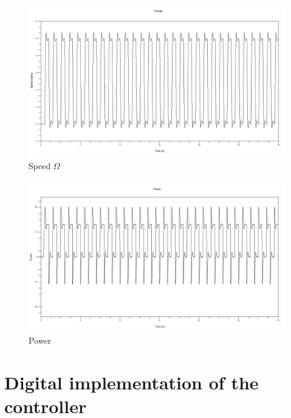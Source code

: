 \documentclass[a4paper,12pt,oneside]{article}
\begin{document}
\begin{enumerate}
\begin{figure}
	\centering
	\includegraphics[width=\columnwidth]{D25.jpg}
	\caption{Speed $\Omega$}
	\label{fig:D25}
\end{figure}
\begin{figure}
	\centering
	\includegraphics[width=\columnwidth]{D24.jpg}
	\caption{Power}
	\label{fig:D24}
\end{figure}


\section{Digital implementation of the controller}


\end{enumerate}
\end{document}
